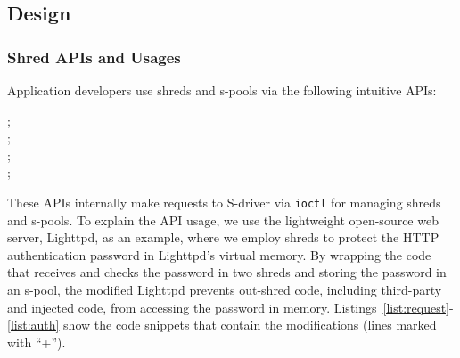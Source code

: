 

\subsection{Design}
\label{shreds:sec:design}
\subsubsection{Shred APIs and Usages}
Application developers use shreds and s-pools via the following intuitive APIs: 

\vspace{.1in}
\indent{};   \\
\indent{};     \\
\indent{};   \\
\indent{};     
\vspace{.1in}

These APIs internally make requests to S-driver via {\tt ioctl} for managing shreds and s-pools.
To explain the API usage, we use the lightweight open-source web server, Lighttpd, as an example, where we employ shreds to protect the HTTP authentication password in Lighttpd's virtual memory. 
By wrapping the code that receives and checks the password in two shreds and storing the password in an s-pool, the modified Lighttpd prevents out-shred code, including third-party and injected code, from accessing the password in memory. 
Listings~\ref{list:request}-\ref{list:auth} show the code snippets that contain the  modifications (lines marked with ``+'').   

